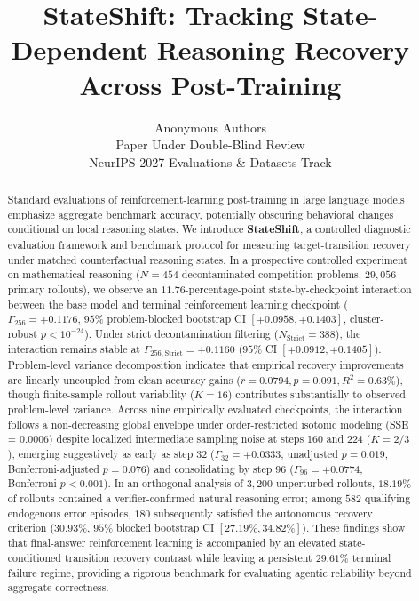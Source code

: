 \documentclass{article}
\title{StateShift: Tracking State-Dependent Reasoning Recovery Across Post-Training}
\author{
  Anonymous Authors \\
  Paper Under Double-Blind Review \\
  NeurIPS 2027 Evaluations \& Datasets Track \\
}
\begin{document}
\maketitle

\begin{abstract}
Standard evaluations of reinforcement-learning post-training in large language models emphasize aggregate benchmark accuracy, potentially obscuring behavioral changes conditional on local reasoning states. We introduce \textbf{StateShift}, a controlled diagnostic evaluation framework and benchmark protocol for measuring target-transition recovery under matched counterfactual reasoning states. In a prospective controlled experiment on mathematical reasoning ($N=454$ decontaminated competition problems, $29,056$ primary rollouts), we observe an $11.76$-percentage-point state-by-checkpoint interaction between the base model and terminal reinforcement learning checkpoint ($\Gamma_{256} = +0.1176$, $95\%$ problem-blocked bootstrap CI $[+0.0958, +0.1403]$, cluster-robust $p < 10^{-24}$). Under strict decontamination filtering ($N_{\text{Strict}}=388$), the interaction remains stable at $\Gamma_{256,\text{Strict}} = +0.1160$ ($95\%$ CI $[+0.0912, +0.1405]$). Problem-level variance decomposition indicates that empirical recovery improvements are linearly uncoupled from clean accuracy gains ($r = 0.0794, p = 0.091, R^2 = 0.63\%$), though finite-sample rollout variability ($K=16$) contributes substantially to observed problem-level variance. Across nine empirically evaluated checkpoints, the interaction follows a non-decreasing global envelope under order-restricted isotonic modeling (SSE = 0.0006) despite localized intermediate sampling noise at steps 160 and 224 ($K=2/3$), emerging suggestively as early as step 32 ($\Gamma_{32} = +0.0333$, unadjusted $p=0.019$, Bonferroni-adjusted $p=0.076$) and consolidating by step 96 ($\Gamma_{96} = +0.0774$, Bonferroni $p < 0.001$). In an orthogonal analysis of $3,200$ unperturbed rollouts, $18.19\%$ of rollouts contained a verifier-confirmed natural reasoning error; among $582$ qualifying endogenous error episodes, $180$ subsequently satisfied the autonomous recovery criterion ($30.93\%$, $95\%$ blocked bootstrap CI $[27.19\%, 34.82\%]$). These findings show that final-answer reinforcement learning is accompanied by an elevated state-conditioned transition recovery contrast while leaving a persistent $29.61\%$ terminal failure regime, providing a rigorous benchmark for evaluating agentic reliability beyond aggregate correctness.
\end{abstract}
\end{document}
